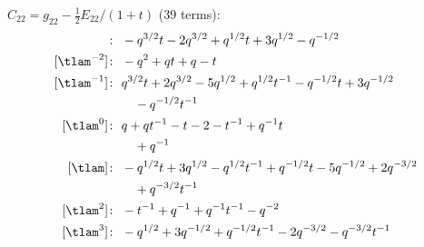 $C_{22} = g_{22} - \tfrac12 E_{22}/(1+t)$ (39 terms):
\begin{align*}
[\tlam^{-3}]\colon\ & -q^{3/2} t -2 q^{3/2} +q^{1/2} t +3 q^{1/2} -q^{-1/2} \\
[\tlam^{-2}]\colon\ & -q^{2} +q t +q -t \\
[\tlam^{-1}]\colon\ & q^{3/2} t +2 q^{3/2} -5 q^{1/2} +q^{1/2} t^{-1} -q^{-1/2} t +3 q^{-1/2} \\
& \quad -q^{-1/2} t^{-1} \\
[\tlam^{0}]\colon\ & q +q t^{-1} -t -2 -t^{-1} +q^{-1} t \\
& \quad +q^{-1} \\
[\tlam]\colon\ & -q^{1/2} t +3 q^{1/2} -q^{1/2} t^{-1} +q^{-1/2} t -5 q^{-1/2} +2 q^{-3/2} \\
& \quad +q^{-3/2} t^{-1} \\
[\tlam^{2}]\colon\ & -t^{-1} +q^{-1} +q^{-1} t^{-1} -q^{-2} \\
[\tlam^{3}]\colon\ & -q^{1/2} +3 q^{-1/2} +q^{-1/2} t^{-1} -2 q^{-3/2} -q^{-3/2} t^{-1}
\end{align*}
